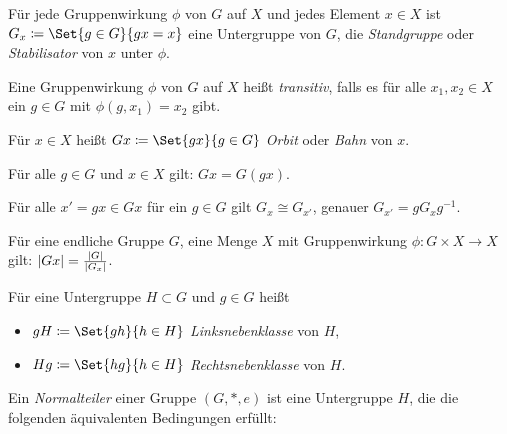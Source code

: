 \documentclass{cheat-sheet}
\begin{document}
\begin{defn}
  Für jede Gruppenwirkung $\phi$ von $G$ auf $X$ und jedes Element $x \in X$ ist $G_x \coloneqq \Set{ g \in G }{ gx = x }$ eine Untergruppe von $G$, die \emph{Standgruppe} oder \emph{Stabilisator} von $x$ unter $\phi$.
\end{defn}

\begin{defn}
  Eine Gruppenwirkung $\phi$ von $G$ auf $X$ heißt \emph{transitiv}, falls es für alle $x_1, x_2 \in X$ ein $g \in G$ mit $\phi(g, x_1) = x_2$ gibt.
\end{defn}

\begin{defn}
  Für $x \in X$ heißt $Gx \coloneqq \Set{ gx }{ g \in G }$ \emph{Orbit} oder \emph{Bahn} von $x$.
\end{defn}

\begin{bem}
  Für alle $g \in G$ und $x \in X$ gilt: $Gx = G(gx)$.
\end{bem}

\begin{bem}
  Für alle $x' = gx \in Gx$ für ein $g \in G$ gilt $G_x \cong G_{x'}$, genauer
  $G_{x'} = g G_x g^{-1}$.
\end{bem}

\begin{satz}
  Für eine endliche Gruppe $G$, eine Menge $X$ mit Gruppenwirkung $\phi : G \times X \to X$ gilt: $\lvert Gx\rvert = \frac{\lvert G\rvert}{\lvert G_x\rvert}$.
\end{satz}

\begin{defn}
  Für eine Untergruppe $H \subset G$ und $g \in G$ heißt
  \begin{itemize}
    \item $gH \coloneqq \Set{ gh }{ h \in H }$ \emph{Linksnebenklasse} von $H$,
    \item $Hg \coloneqq \Set{ hg }{ h \in H }$ \emph{Rechtsnebenklasse} von $H$.
  \end{itemize}
\end{defn}

\begin{defn}
  Ein \emph{Normalteiler} einer Gruppe $(G, *, e)$ ist eine Untergruppe $H$, die die folgenden äquivalenten Bedingungen erfüllt:
  \begin{itemize}
  \end{itemize}
\end{defn}
\end{document}
